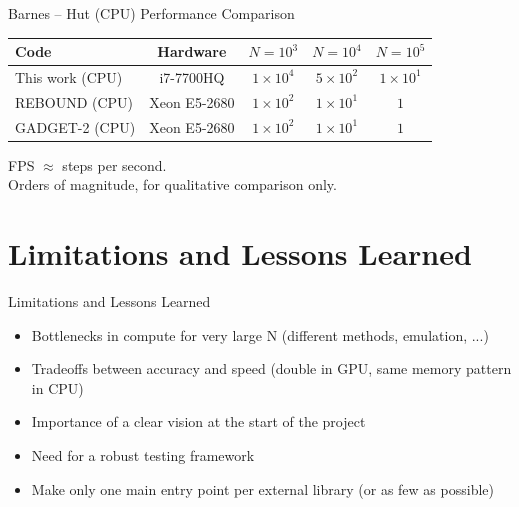\documentclass{beamer}
\begin{document}
\begin{frame}{Barnes -- Hut (CPU) Performance Comparison}
    \centering
    \small
    \renewcommand{\arraystretch}{1.5}
    \begin{tabular}{|l|c|c|c|c|}
        \hline
        \textbf{Code} & \textbf{Hardware} & $N = 10^3$ & $N = 10^4$ & $N = 10^5$ \\
        \hline
        This work (CPU) & i7-7700HQ & $1 \times 10^4$ & $5 \times 10^2$ & $1 \times 10^{1}$ \\
        REBOUND (CPU) & Xeon E5-2680 & $1 \times 10^2$ & $1 \times 10^1$ & $1$ \\
        GADGET-2 (CPU) & Xeon E5-2680 & $1 \times 10^2$ & $1 \times 10^1$ & $1$ \\
        \hline
    \end{tabular}
    \vspace{0.5em}
    
    {\footnotesize
    FPS $\approx$ steps per second.\\
    Orders of magnitude, for qualitative comparison only.\\
    }
\end{frame}

\section{Limitations and Lessons Learned}
\begin{frame}{Limitations and Lessons Learned}
    \begin{itemize}
        \item Bottlenecks in compute for very large N (different methods, emulation, ...)
        \item Tradeoffs between accuracy and speed (double in GPU, same memory pattern in CPU)
        \item Importance of a clear vision at the start of the project
        \item Need for a robust testing framework
        \item Make only one main entry point per external library (or as few as possible)
    \end{itemize}
\end{frame}
\end{document}
